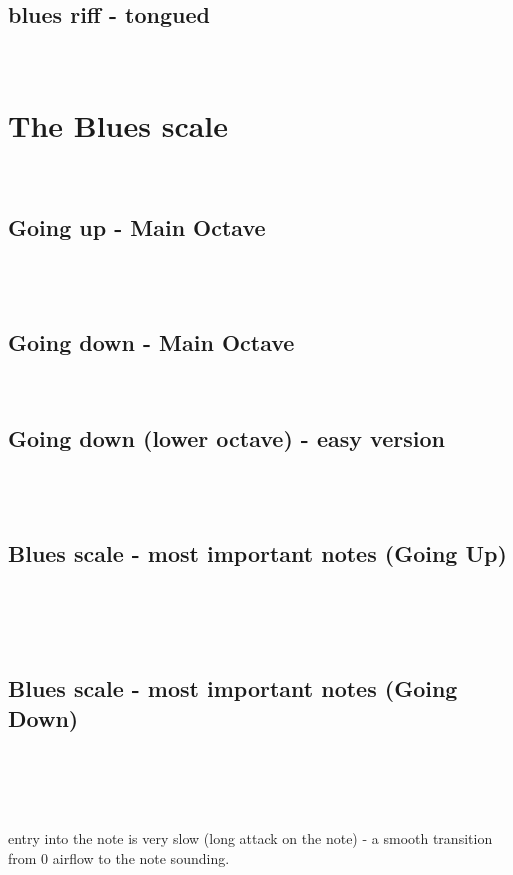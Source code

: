             
        \subsection{blues riff - tongued}
            \fdta\fdta\fdta\fdta  \\
            
\newpage
\section{The Blues scale}\\

\subsection{Going up - Main Octave}\\
\2\3\four\e\4\5\six\\

\subsection{Going down - Main Octave}\\
\six\5\4\e\four\3\2

\subsection{Going down (lower octave) - easy version}\\
\2\w\1\\


\subsection{Blues scale - most important notes (Going Up)}\\
\1\w \2 \\
\2\3\four\e\4\5\\

\subsection{Blues scale - most important notes (Going Down)}\\
\5\4\e\four\3\2 \\
\2\w\1\\

\newpage
\4 \fdb \4\\
entry into the note is very slow (long attack on the note) - a smooth transition from 0 airflow to the note sounding.\\

